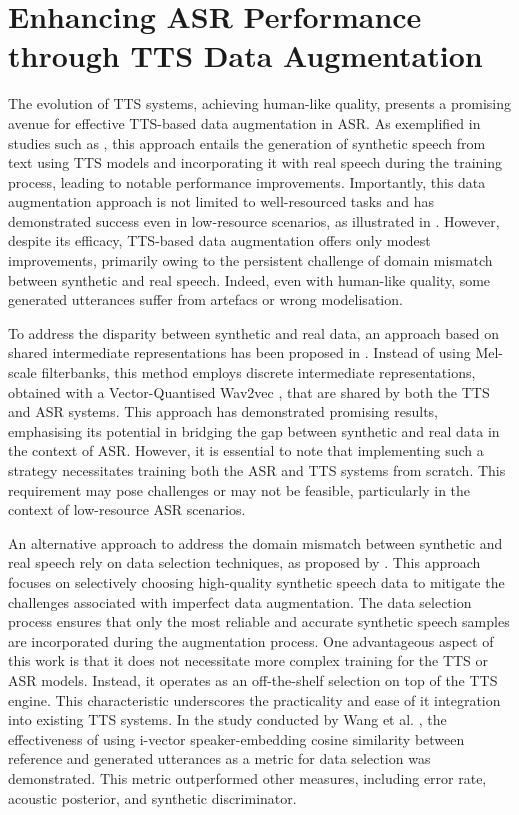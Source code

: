 \section{Enhancing ASR Performance through TTS Data Augmentation}
The evolution of \ac{TTS} systems, achieving human-like quality, presents a promising avenue for effective \ac{TTS}-based data augmentation in \ac{ASR}.
As exemplified in studies such as \cite{laptev2020you}, this approach entails the generation of synthetic speech from text using \ac{TTS} models and incorporating it with real speech during the training process, leading to notable performance improvements. Importantly, this data augmentation approach is not limited to well-resourced tasks and has demonstrated success even in low-resource scenarios, as illustrated in \cite{casanova2022asr}. However, despite its efficacy, \ac{TTS}-based data augmentation offers only modest improvements, primarily owing to the persistent challenge of domain mismatch between synthetic and real speech. Indeed, even with human-like quality, some generated utterances suffer from artefacs or wrong modelisation.

To address the disparity between synthetic and real data, an approach based on shared intermediate representations has been proposed in \cite{9688218}. Instead of using Mel-scale filterbanks, this method employs discrete intermediate representations, obtained with a Vector-Quantised Wav2vec \cite{vqwav2vec}, that are shared by both the \ac{TTS} and \ac{ASR} systems. This approach has demonstrated promising results, emphasising its potential in bridging the gap between synthetic and real data in the context of \ac{ASR}. However, it is essential to note that implementing such a strategy necessitates training both the \ac{ASR} and \ac{TTS} systems from scratch. This requirement may pose challenges or may not be feasible, particularly in the context of low-resource \ac{ASR} scenarios.

An alternative approach to address the domain mismatch between synthetic and real speech rely on data selection techniques, as proposed by \cite{wang2021towards}. This approach focuses on selectively choosing high-quality synthetic speech data to mitigate the challenges associated with imperfect data augmentation. The data selection process ensures that only the most reliable and accurate synthetic speech samples are incorporated during the augmentation process. One advantageous aspect of this work is that it does not necessitate more complex training for the \ac{TTS} or \ac{ASR} models. Instead, it operates as an off-the-shelf selection on top of the \ac{TTS} engine. This characteristic underscores the practicality and ease of it integration into existing \ac{TTS} systems.
In the study conducted by Wang et al. \cite{wang2021towards}, the effectiveness of using i-vector speaker-embedding cosine similarity between reference and generated utterances as a metric for data selection was demonstrated. This metric outperformed other measures, including error rate, acoustic posterior, and synthetic discriminator.

